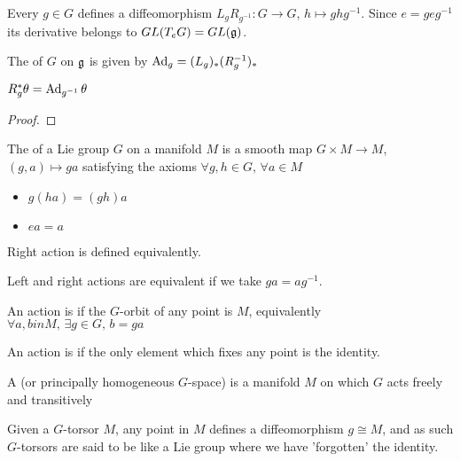 \documentclass{article}
\begin{document}
Every $g \in G$ defines a diffeomorphism $L_g R_{g^{-1}} : G \to G$, $h \mapsto ghg^{-1}$. Since $e = geg^{-1}$ its derivative belongs to $GL(T_e G) = GL(\mathfrak{g})$. 
\begin{definition}
The  of $G$ on $\mathfrak{g}$ is given by $\operatorname{Ad}_g = (L_g)_\ast (R_g^{-1})_\ast$
\end{definition}

\begin{lemma}
$R_g^\ast \theta = \operatorname{Ad}_{g^{-1}} \theta$
\end{lemma}
\begin{proof}
\end{proof}

\begin{definition}
The  of a Lie group $G$ on a manifold $M$ is a smooth map $G \times M \to M$, $(g,a) \mapsto ga$ satisfying the axioms $\forall g,h \in G, \, \forall a \in M$
\begin{itemize}
    \item $g(ha) = (gh)a$
    \item $ea = a$
\end{itemize}
Right action is defined equivalently. 
\end{definition}

Left and right actions are equivalent if we take $ga = ag^{-1}$. 
\begin{definition}
An action is  if the $G$-orbit of any point is $M$, equivalently $\forall a,b in M, \, \exists g \in G, \, b = ga$
\end{definition}

\begin{definition}
An action is  if the only element which fixes any point is the identity. 
\end{definition}

\begin{definition}
A  (or principally homogeneous $G$-space) is a manifold $M$ on which $G$ acts freely and transitively
\end{definition}
Given a $G$-torsor $M$, any point in $M$ defines a diffeomorphism $g \cong M$, and as such $G$-torsors are said to be like a Lie group where we have 'forgotten' the identity. 
\end{document}
